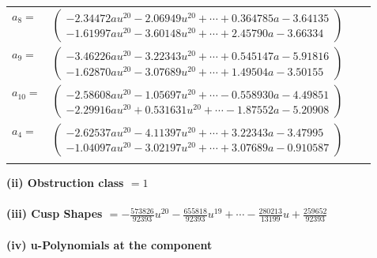 \documentclass[1p]{elsarticle_modified}
\theoremstyle{definition}
\begin{document}
\begin{tabular}{m{7pt} m{180pt} m{7pt} m{180pt} }
\flushright $a_{8}=$&$\begin{pmatrix}-2.34472 a u^{20}-2.06949 u^{20}+\cdots+0.364785 a-3.64135\\-1.61997 a u^{20}-3.60148 u^{20}+\cdots+2.45790 a-3.66334\end{pmatrix}$ \\
\flushright $a_{9}=$&$\begin{pmatrix}-3.46226 a u^{20}-3.22343 u^{20}+\cdots+0.545147 a-5.91816\\-1.62870 a u^{20}-3.07689 u^{20}+\cdots+1.49504 a-3.50155\end{pmatrix}$ \\
\flushright $a_{10}=$&$\begin{pmatrix}-2.58608 a u^{20}-1.05697 u^{20}+\cdots-0.558930 a-4.49851\\-2.29916 a u^{20}+0.531631 u^{20}+\cdots-1.87552 a-5.20908\end{pmatrix}$ \\
\flushright $a_{4}=$&$\begin{pmatrix}-2.62537 a u^{20}-4.11397 u^{20}+\cdots+3.22343 a-3.47995\\-1.04097 a u^{20}-3.02197 u^{20}+\cdots+3.07689 a-0.910587\end{pmatrix}$\\&\end{tabular}
\flushleft \textbf{(ii) Obstruction class $= 1$}\\~\\
\flushleft \textbf{(iii) Cusp Shapes $= -\frac{573826}{92393} u^{20}-\frac{655818}{92393} u^{19}+\cdots-\frac{280213}{13199} u+\frac{259652}{92393}$}\\~\\
\newpage\renewcommand{\arraystretch}{1}
\flushleft \textbf{(iv) u-Polynomials at the component}\newline \\
\end{document}
